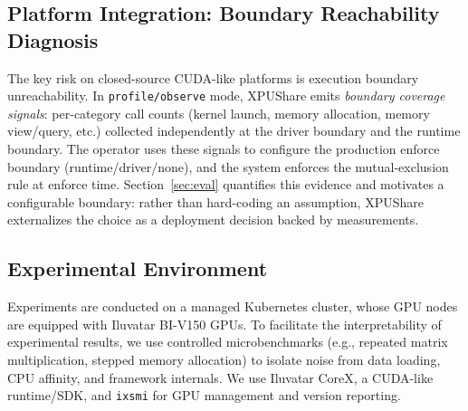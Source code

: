 \documentclass[runningheads,a4paper]{llncs}
\begin{document}
\subsection{Platform Integration: Boundary Reachability Diagnosis}

The key risk on closed-source CUDA-like platforms is execution boundary
unreachability. In \texttt{profile/observe} mode, XPUShare emits \emph{boundary
coverage signals}: per-category call counts (kernel launch, memory
allocation, memory view/query, etc.) collected independently at the driver
boundary and the runtime boundary. The operator uses these signals to
configure the production enforce boundary (runtime/driver/none), and
the system enforces the mutual-exclusion rule at enforce time.
Section~\ref{sec:eval} quantifies this evidence and motivates a
configurable boundary: rather than hard-coding an assumption, XPUShare
externalizes the choice as a deployment decision backed by measurements.

\subsection{Experimental Environment}
\label{sec:env}

Experiments are conducted on a managed Kubernetes cluster, whose GPU
nodes are equipped with Iluvatar BI-V150 GPUs. To facilitate the
interpretability of experimental results, we use controlled microbenchmarks (e.g., repeated matrix
multiplication, stepped memory allocation) to isolate noise from data
loading, CPU affinity, and framework internals.
We use Iluvatar CoreX, a CUDA-like runtime/SDK, and \texttt{ixsmi} for
GPU management and version reporting.
\end{document}
